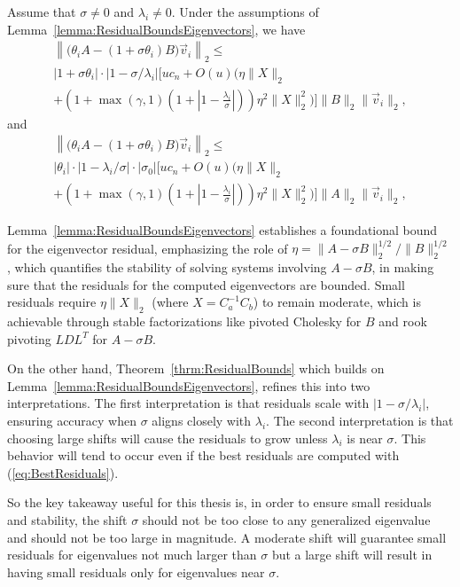 \begin{theorem}\label{thrm:ResidualBounds}
	Assume that $\sigma\neq 0$ and $\lambda_i\neq 0$.  Under the assumptions of Lemma~\ref{lemma:ResidualBoundsEigenvectors}, we have
	\begin{multline*}
		\left\| \big(\theta_i A - (1+\sigma \theta_i) B\big) \vec{v}_i \right\|_2
		\leq \\
		|1+\sigma \theta_i| \cdot |1-\sigma/\lambda_i| \Bigg[
		uc_n +O(u)\Bigg( \eta\|X\|_2 \\
		+ \left(1 + \max(\gamma, 1)
		\left(1+ \left| 1 - \frac{\lambda_i}{\sigma}\right|\right)\right)
		\eta^2\|X\|_2^2 \Bigg) \Bigg] \|B\|_2 \|\vec{v}_i\|_2,
	\end{multline*}
	and
	\begin{multline*}
		\left\| \big(\theta_i A - (1+\sigma \theta_i) B\big) \vec{v}_i \right\|_2
		\leq \\
		|\theta_i| \cdot |1-\lambda_i/\sigma| \cdot |\sigma_0| \Bigg[
		uc_n +O(u)\Bigg( \eta\|X\|_2 \\
		+ \left(1 + \max(\gamma, 1) \left(1+ \left| 1
		- \frac{\lambda_i}{\sigma}\right|\right)\right)
		\eta^2\|X\|_2^2 \Bigg) \Bigg] \|A\|_2 \|\vec{v}_i\|_2,
	\end{multline*}
\end{theorem}
Lemma~\ref{lemma:ResidualBoundsEigenvectors} establishes a foundational bound for the eigenvector residual, emphasizing the role of $\eta = \|A - \sigma B\|_2^{1/2}/\|B\|_2^{1/2} $, which quantifies the stability of solving systems involving $A-\sigma B$, in making sure that the residuals for the computed eigenvectors are bounded. Small residuals require $\eta \|X\|_2$ (where $X = C_a^{-1}C_b$) to remain moderate, which is achievable through stable factorizations like pivoted Cholesky for $B$ and rook pivoting $LDL^T$ for $A-\sigma B$.

On the other hand, Theorem~\ref{thrm:ResidualBounds} which builds on Lemma~\ref{lemma:ResidualBoundsEigenvectors}, refines this into two interpretations. The first interpretation is that residuals scale with $\lvert 1 - \sigma/ \lambda_i \rvert$, ensuring accuracy when $\sigma$ aligns closely with $\lambda_i$. The second interpretation is that choosing large shifts will cause the residuals to grow unless $\lambda_i$ is near $\sigma$. This behavior will tend to occur even if the best residuals are computed with (\ref{eq:BestResiduals}).

So the key takeaway useful for this thesis is, in order to ensure small residuals and stability, the shift $\sigma$ should not be too close to any generalized eigenvalue and should not be too large in magnitude. A moderate shift will guarantee small residuals for eigenvalues not much larger than $\sigma$ but a large shift will result in having small residuals only for eigenvalues near $\sigma$.

